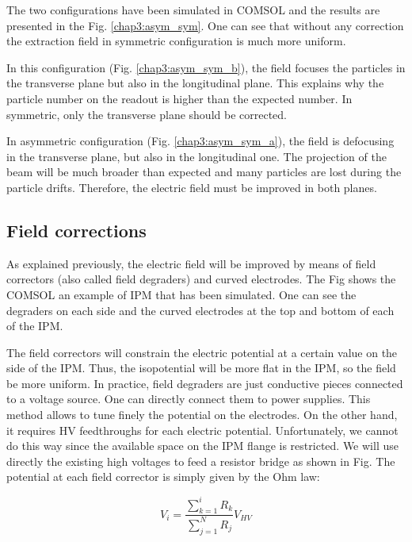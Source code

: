 \begin{refsection}
  The two configurations have been simulated in COMSOL and the results are presented in the Fig. \ref{chap3:asym_sym}. One can see that without any correction the extraction field in symmetric configuration is much more uniform. 
  
  In this configuration (Fig. \ref{chap3:asym_sym_b}), the field focuses the particles in the transverse plane but also in the longitudinal plane. This explains why the particle number on the readout is higher than the expected number. In symmetric, only the transverse plane should be corrected.

  In asymmetric configuration (Fig. \ref{chap3:asym_sym_a}), the field is defocusing in the transverse plane, but also in the  longitudinal one. The projection of the beam will be much broader than expected and many particles are lost during the particle drifts. Therefore, the electric field must be improved in both planes.


  

  \subsection{Field corrections}
  As explained previously, the electric field will be improved by means of field correctors (also called field degraders) and curved electrodes. The Fig shows the COMSOL an example of IPM that has been simulated. One can see the degraders on each side and the curved electrodes at the top and bottom of each of the IPM.


  The field correctors will constrain the electric potential at a certain value on the side of the IPM. Thus, the isopotential will be more flat in the IPM, so the field be more uniform. In practice, field degraders are just conductive pieces connected to a voltage source. One can directly connect them to power supplies. This method allows to tune finely the potential on the electrodes. On the other hand, it requires HV feedthroughs for each electric potential. Unfortunately, we cannot do this way since the available space on the IPM flange is restricted. We will use directly the existing high voltages to feed a resistor bridge as shown in Fig.  The potential at each field corrector is simply given by the Ohm law:

  \begin{equation}
    V_{i} = \frac{\sum_{k = 1}^{i} R_{k}}{\sum_{j = 1}^{N} R_{j}}V_{HV}
  \end{equation}


\end{refsection}
